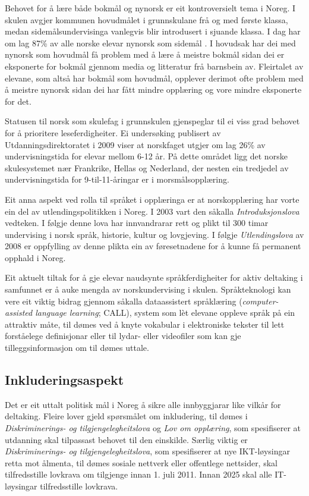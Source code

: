 \begin{multicols}{2}
Behovet for å lære både bokmål og nynorsk er eit kontroversielt tema i Noreg. I skulen avgjer kommunen hovudmålet i grunnskulane frå og med første klassa, medan sidemålsundervisinga vanlegvis blir introdusert i sjuande klassa. I dag har om lag 87\% av alle norske elevar nynorsk som sidemål \cite{SR:2010}. %
I hovudsak har dei med nynorsk som hovudmål få problem med å lære å meistre bokmål sidan dei er eksponerte for bokmål gjennom media og litteratur frå barnsbein av. Fleirtalet av elevane, som altså har bokmål som hovudmål, opplever derimot ofte problem med å meistre nynorsk sidan dei har fått mindre opplæring og vore mindre eksponerte for det. 

Statusen til norsk som skulefag i grunnskulen gjenspeglar til ei viss grad behovet for å prioritere leseferdigheiter. Ei undersøking publisert av Utdanningsdirektoratet i 2009 viser at norskfaget utgjer om lag 26\% av undervisningstida for elevar mellom 6-12 år. 
På dette området ligg det norske skulesystemet nær Frankrike, Hellas og Nederland, der nesten ein tredjedel av undervisningstida for 9-til-11-åringar er i morsmålsopplæring.

Eit anna aspekt ved rolla til språket i opplæringa er at norskopplæring har vorte ein del av utlendingspolitikken i Noreg. 
I 2003 vart den såkalla \textit{Introduksjonslova} vedteken. I følgje denne lova har innvandrarar rett og plikt til 300 timar undervising i norsk språk, historie, kultur og lovgjeving. 
I følgje \textit{Utlendingslova} av 2008 er oppfylling av denne plikta ein av føresetnadene for å kunne få permanent opphald i Noreg. 

Eit aktuelt tiltak for å gje elevar naudsynte språkferdigheiter for aktiv deltaking i samfunnet er å auke mengda av norskundervising i skulen. 
Språkteknologi kan vere eit viktig bidrag gjennom såkalla dataassistert språklæring (\textit{computer-assisted language learning}; CALL), system som lèt elevane oppleve språk på ein attraktiv måte, til dømes ved å knyte vokabular i elektroniske tekster til lett forståelege definisjonar eller til lydar- eller videofiler som kan gje tilleggsinformasjon om til dømes uttale. 

\subsection{Inkluderingsaspekt} 

Det er eit uttalt politisk mål i Noreg å sikre alle innbyggjarar like vilkår for deltaking. 
Fleire lover gjeld spørsmålet om inkludering, til dømes i \textit{Diskriminerings- og tilgjengelegheitslova} og \textit{Lov om opplæring}, som spesifiserer at utdanning skal tilpassast behovet til den einskilde. Særlig viktig er \textit{Diskriminerings- og tilgjengelegheitslova}, som spesifiserer at nye IKT-løysingar retta mot ålmenta, til dømes sosiale nettverk eller offentlege nettsider, skal tilfredsstille lovkrava om tilgjenge innan 1. juli 2011. 
Innan 2025 skal alle IT-løysingar tilfredsstille lovkrava. 


\end{multicols}
